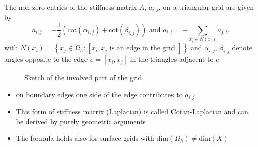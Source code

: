 \begin{lemma}
\label{thm:stiffnessmatrixlemma}
	The non-zero entries of the stiffness matrix $A$, $a_{i,j}$, on a triangular grid are given by
	\[
		a_{i,j} = -\frac{1}{2}(\text{cot}(\alpha_{i,j}) + \text{cot}(\beta_{i,j})) \text{ and } a_{i,i} = -\sum_{x_{j}\in N(x_{i})}^{}{a_{j,i}}
	.\] 
	with $N(x_{i})=\left\{ x_{j} \in \Omega _{h} : \left[ x_{i},x_{j} \text{ is an edge in the grid } \right]  \right\} $ and $\alpha_{i,j}$, $\beta_{i,j}$ denote angles opposite to the edge $e=[x_{i}, x_{j}]$ in the triangles adjacent to $e$

	\begin{figure}[ht!]
		\begin{center}
			
		\end{center}
		\caption{Sketch of the involved part of the grid}
		\label{fig:pentagonrelations}
	\end{figure}
	

	\begin{itemize}[label=\underline{Note}: ]
	\item 
	on boundary edges one side of the edge contributes to $a_{i,j}$

	\item This form of stiffness matrix (Laplacian) is called \underline{Cotan-Laplacian} and can be derived by purely geometric arguments

	\item The formula holds also for surface grids with $\text{dim}(\Omega _{h}) \neq \text{dim}(X)$
\end{itemize}

\end{lemma}

